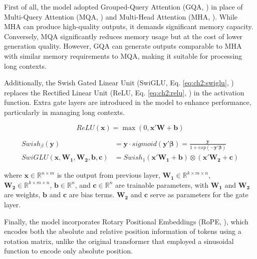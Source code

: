 First of all, the model adopted Grouped-Query Attention (GQA, \cite{ainslie2023gqa}) in place of Multi-Query Attention (MQA, \cite{vaswani-etal2018}) and Multi-Head Attention (MHA, \cite{vaswani-etal2018}). While MHA can produce high-quality outputs, it demands significant memory capacity. Conversely, MQA significantly reduces memory usage but at the cost of lower generation quality. However, GQA can generate outputs comparable to MHA with similar memory requirements to MQA, making it suitable for processing long contexts.

Additionally, the Swish Gated Linear Unit (SwiGLU, Eq. \eqref{eq:ch2:swiglu}, \cite{shazeer2020glu}) replaces the Rectified Linear Unit (ReLU, Eq. \eqref{eq:ch2:relu}, \cite{glorot2011deep}) in the activation function. Extra gate layers are introduced in the model to enhance performance, particularly in managing long contexts.


\begin{equation}\label{eq:ch2:relu}
    ReLU (\mathbf {x} )=\max(0,\mathbf {x} '\mathbf{W} + \mathbf{b})
\end{equation}


\begin{equation}\label{eq:ch2:swiglu}
    \begin{split}
        Swish_{\beta}(\mathbf{y}) &= \mathbf{y} \cdot sigmoid(\mathbf{y}' \mathbf{\beta}) = \frac{\mathbf{y}}{1 + exp(-\mathbf{y}' \mathbf{\beta})} \\
        SwiGLU(\mathbf{x}, \mathbf{W_1}, \mathbf{W_2}, \mathbf{b}, \mathbf{c}) &= Swish_{1}(\mathbf{x}' \mathbf{W_1} + \mathbf{b}) \otimes (\mathbf{x}' \mathbf{W_2} + \mathbf{c})
    \end{split}
\end{equation}

where $\mathbf{x} \in \mathbb{R}^{n \times m}$ is the output from previous layer, $\mathbf{W_1} \in \mathbb{R}^{k \times m \times n}$, $\mathbf{W_2} \in \mathbb{R}^{k \times m \times n}$, $\mathbf{b} \in \mathbb{R}^{n}$, and $\mathbf{c} \in \mathbb{R}^{n}$ are trainable parameters, with $\mathbf{W_1}$ and $\mathbf{W_2}$ are weights, $\mathbf{b}$ and $\mathbf{c}$ are bias terms. $\mathbf{W_2}$ and $\mathbf{c}$ serve as parameters for the gate layer.


Finally, the model incorporates Rotary Positional Embeddings (RoPE, \cite{su2024roformer}), which encodes both the absolute and relative position information of tokens using a rotation matrix, unlike the original transformer that employed a sinusoidal function to encode only absolute position.

